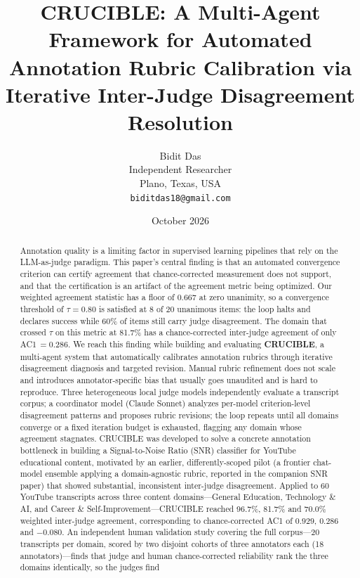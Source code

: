 \documentclass[11pt]{article}
\title{\textbf{CRUCIBLE: A Multi-Agent Framework for Automated Annotation
Rubric Calibration via Iterative Inter-Judge Disagreement Resolution}}
\author{
  Bidit Das \\
  Independent Researcher \\
  Plano, Texas, USA \\
  \texttt{biditdas18@gmail.com}
}
\date{October 2026}
\begin{document}
\maketitle

\begin{abstract}
Annotation quality is a limiting factor in supervised learning pipelines
that rely on the LLM-as-judge paradigm. This paper's central finding is
that an automated convergence criterion can certify agreement that
chance-corrected measurement does not support, and that the certification
is an artifact of the agreement metric being optimized. Our weighted
agreement statistic has a floor of $0.667$ at zero unanimity, so a
convergence threshold of $\tau = 0.80$ is satisfied at 8 of 20 unanimous
items: the loop halts and declares success while 60\% of items still carry
judge disagreement. The domain that crossed $\tau$ on this metric at
81.7\% has a chance-corrected inter-judge agreement of only
AC1\,$=0.286$. We reach this finding while building and evaluating
\textbf{CRUCIBLE}, a multi-agent system that automatically calibrates
annotation rubrics through iterative disagreement diagnosis and targeted
revision. Manual rubric refinement does not scale and introduces
annotator-specific bias that usually goes unaudited and is hard to
reproduce. Three heterogeneous local judge models independently evaluate a
transcript corpus; a coordinator model (Claude Sonnet) analyzes per-model
criterion-level disagreement patterns and proposes rubric revisions; the
loop repeats until all domains converge or a fixed iteration budget is
exhausted, flagging any domain whose agreement stagnates. CRUCIBLE was
developed to solve a concrete annotation bottleneck in building a
Signal-to-Noise Ratio (SNR) classifier for YouTube educational content,
motivated by an earlier, differently-scoped pilot (a frontier chat-model
ensemble applying a domain-agnostic rubric, reported in the companion SNR
paper) that showed substantial, inconsistent inter-judge disagreement.
Applied to 60 YouTube transcripts across three content domains---General
Education, Technology \& AI, and Career \& Self-Improvement---CRUCIBLE
reached 96.7\%, 81.7\% and 70.0\% weighted inter-judge agreement,
corresponding to chance-corrected AC1 of $0.929$, $0.286$ and $-0.080$.
An independent human validation study covering the full corpus---20
transcripts per domain, scored by two disjoint cohorts of three annotators
each (18 annotators)---finds that judge and human chance-corrected
reliability rank the three domains identically, so the judges find

\end{abstract}
\end{document}
